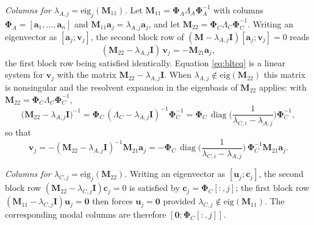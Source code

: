 \documentclass[11pt]{article}
\theoremstyle{remark}
\newcommand{\Ph}{\mathbf{\Phi}}
\newcommand{\Id}{\mathbf{I}}
\DeclareMathOperator{\diag}{diag}
\begin{document}
\emph{Columns for $\lambda_{A,j}=\mathrm{eig}_j(\mathbf{M}_{11})$.}
Let $\mathbf{M}_{11}=\Ph_A\Lambda_A\Ph_A^{-1}$ with columns
$\Ph_A=[\mathbf{a}_1,\dots,\mathbf{a}_n]$ and
$\mathbf{M}_{11}\mathbf{a}_j=\lambda_{A,j}\mathbf{a}_j$, and let
$\mathbf{M}_{22}=\Ph_C\Lambda_C\Ph_C^{-1}$. Writing an eigenvector as
$[\mathbf{a}_j;\mathbf{v}_j]$, the second block row of
$(\mathbf{M}-\lambda_{A,j}\Id)[\mathbf{a}_j;\mathbf{v}_j]=0$ reads
\begin{equation}
(\mathbf{M}_{22}-\lambda_{A,j}\Id)\,\mathbf{v}_j=-\mathbf{M}_{21}\mathbf{a}_j,
\label{eq:blteq}
\end{equation}
the first block row being satisfied identically.  Equation
\eqref{eq:blteq} is a linear system for $\mathbf{v}_j$ with the matrix
$\mathbf{M}_{22}-\lambda_{A,j}\Id$.  When
$\lambda_{A,j}\notin\mathrm{eig}(\mathbf{M}_{22})$ this matrix is nonsingular
and the resolvent expansion in the eigenbasis of $\mathbf{M}_{22}$ applies:
with $\mathbf{M}_{22}=\Ph_C\Lambda_C\Ph_C^{-1}$,
\begin{equation}
\bigl(\mathbf{M}_{22}-\lambda_{A,j}\Id\bigr)^{-1}
=\Ph_C\,(\Lambda_C-\lambda_{A,j}\Id)^{-1}\Ph_C^{-1}
=\Ph_C\,\diag\!\Big(\frac{1}{\lambda_{C,i}-\lambda_{A,j}}\Big)\Ph_C^{-1},
\end{equation}
so that
\begin{equation}
\mathbf{v}_j=-(\mathbf{M}_{22}-\lambda_{A,j}\Id)^{-1}\mathbf{M}_{21}\mathbf{a}_j
=-\Ph_C\,\diag\!\Big(\frac{1}{\lambda_{C,i}-\lambda_{A,j}}\Big)
\,\Ph_C^{-1}\mathbf{M}_{21}\mathbf{a}_j.
\label{eq:vrec}
\end{equation}

\emph{Columns for $\lambda_{C,j}=\mathrm{eig}_j(\mathbf{M}_{22})$.}
Writing an eigenvector as $[\mathbf{u}_j;\mathbf{c}_j]$, the second block row
$(\mathbf{M}_{22}-\lambda_{C,j}\Id)\mathbf{c}_j=0$ is satisfied by
$\mathbf{c}_j=\Ph_C[:,j]$; the first block row
$(\mathbf{M}_{11}-\lambda_{C,j}\Id)\mathbf{u}_j=\mathbf{0}$ then forces
$\mathbf{u}_j=\mathbf{0}$ provided $\lambda_{C,j}\notin\mathrm{eig}(\mathbf{M}_{11})$.
The corresponding modal columns are therefore $[\mathbf{0};\Ph_C[:,j]]$.
\end{document}
